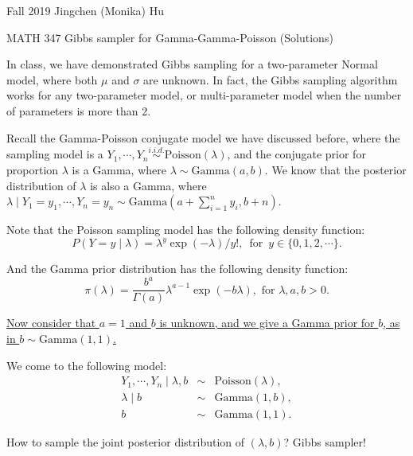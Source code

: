 \documentclass[11pt]{article}
\begin{document}
\enlargethispage{\baselineskip}

Fall 2019 \hfill Jingchen (Monika) Hu\\

\begin{center}
{\huge MATH 347 Gibbs sampler for Gamma-Gamma-Poisson (Solutions)}
\end{center}
\vspace{0.5cm}


In class, we have demonstrated Gibbs sampling for a two-parameter Normal model, where both $\mu$ and $\sigma$ are unknown. In fact, the Gibbs sampling algorithm works for any two-parameter model, or multi-parameter model when the number of parameters is more than 2. 

Recall the Gamma-Poisson conjugate model we have discussed before, where the sampling model is a $Y_1, \cdots, Y_n \overset{i.i.d.}{\sim} \textrm{Poisson}(\lambda)$, and the conjugate prior for proportion $\lambda$ is a Gamma, where $\lambda \sim \textrm{Gamma}(a, b)$. We know that the posterior distribution of $\lambda$ is also a Gamma, where $\lambda \mid Y_1 = y_1, \cdots, Y_n = y_n \sim \textrm{Gamma}(a + \sum_{i=1}^{n}y_i, b + n)$. 

Note that the Poisson sampling model has the following density function:
\begin{equation}
P(Y = y \mid \lambda) = \lambda^{y}\exp(-\lambda)/y!, \,\,\, \text{for}\,\,\, y \in \{0, 1, 2, \cdots\}.
\end{equation}

And the Gamma prior distribution has the following density function:
\begin{equation}
\pi(\lambda) = \frac{b^a}{\Gamma(a)}\lambda^{a-1}\exp(-b\lambda),\,\, \text{for}\,\, \lambda, a, b >0.
\end{equation}

{\underline{Now consider that $a = 1$ and $b$ is unknown, and we give a Gamma prior for $b$, as in $b \sim \textrm{Gamma}(1, 1)$.}} 

We come to the following model:
\begin{eqnarray}
Y_1, \cdots, Y_n  \mid \lambda, b &\sim& \textrm{Poisson}(\lambda), \\
\lambda \mid b &\sim& \textrm{Gamma}(1, b), \\
b &\sim& \textrm{Gamma}(1, 1).
\end{eqnarray}

How to sample the joint posterior distribution of $(\lambda, b)$? Gibbs sampler!
\end{document}
